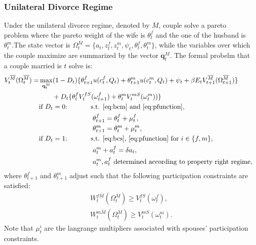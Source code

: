 \documentclass[12pt]{article}
\numberwithin{table}{section}
\begin{document}
\subsubsection*{Unilateral Divorce Regime}
Under the unilateral divorce regime, denoted by $\overline{M}$, couple solve a pareto problem where the pareto weight of the wife is $\theta^f_t$ and the one of the husband is $\theta^m_t$.The state vector is $\Omega^{\overline{M}}_t=\{a_t,z^f_t,z^m_t,\psi_t,\theta^f_t,\theta^m_t\}$, while the variables over which the couple maximize are summarized by the vector $\mathbf{q}^M_t$. The formal probelm that a couple married is $t$ solve is:
\begin{equation}\label{eq:v_uni}
\begin{split}
V_t^{\overline{M}}(\Omega^{\overline{M}}_t)=&\max_{\mathbf{q}^M_t} (1-D_t)\{\theta^f_{t+1} u(c^f_t,Q_t)+\theta^m_{t+1} u(c^m_t,Q_t)+\psi_t+\beta E_t V^{\overline{M}}_{t+1}(\Omega^{\overline{M}}_{t+1})\}\\ &\quad\quad+D_t \{\theta^f_{t}V^{fS}_{t}(\omega^{f}_{t+1})+\theta^m_{t} V^{mS}_{t}(\omega^{m}_{t}))\}
\\ &\text{if $D_t=0$:}\hspace{35pt}\text{s.t. \eqref{eq:bcm} and \eqref{eq:pfunction},}\\ &\hspace{80pt}
\theta^f_{t+1}=\theta^f_{t}+\mu^f_t,\\ &\hspace{80pt}
\theta^m_{t+1}=\theta^m_{t}+\mu^m_t,
\\ &\text{if $D_t=1$:}\hspace{35pt}\text{s.t. \eqref{eq:bcs}, \eqref{eq:pfunction} for $i\in\{f,m\}$,}\\ &
\hspace{80pt}a_t^m+a_t^f=\delta a_t,	\\ &
\hspace{80pt}a_t^m,a_t^f\text{ determined according to property right regime},
\end{split}
\end{equation}
where $\theta^f_{t+1}$ and $\theta^m_{t+1}$ adjust such that the following participation constraints are satisfied:
\begin{equation}\label{eq:p_cons_mar}
\begin{split}
&
W^{f\overline{M}}_{t}(\Omega^{\overline{M}}_{t})\geq V_{t}^{fS}(\omega^f_{t}),\\ &
W^{m\overline{M}}_{t}(\Omega^{\overline{M}}_{t})\geq V_{t}^{mS}(\omega^m_{t}). 
\end{split}
\end{equation}
Note that $\mu^i_t$ are the langrange multipliers associated with spouses' participation constraints.
\end{document}
